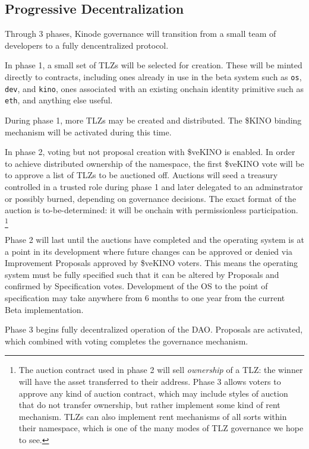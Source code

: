 \documentclass[runningheads]{llncs}
\begin{document}
\subsection{Progressive Decentralization}
\label{sec:daodecentralization}

Through 3 phases, Kinode governance will transition from a small team of developers to a fully dencentralized protocol.

In phase 1, a small set of TLZs will be selected for creation. These will be minted directly to contracts, including ones already in use in the beta system such as \verb|os|, \verb|dev|, and \verb|kino|, ones associated with an existing onchain identity primitive such as \verb|eth|, and anything else useful.

During phase 1, more TLZs may be created and distributed.
The \$KINO binding mechanism will be activated during this time.

In phase 2, voting but not proposal creation with \$veKINO is enabled.
In order to achieve distributed ownership of the namespace, the first \$veKINO vote will be to approve a list of TLZs to be auctioned off.
Auctions will seed a treasury controlled in a trusted role during phase 1 and later delegated to an adminstrator or possibly burned, depending on governance decisions.
The exact format of the auction is to-be-determined: it will be onchain with permissionless participation.
\footnote{The auction contract used in phase 2 will sell \textit{ownership} of a TLZ: the winner will have the asset transferred to their address.
Phase 3 allows voters to approve any kind of auction contract, which may include styles of auction that do not transfer ownership, but rather implement some kind of rent mechanism.
TLZs can also implement rent mechanisms of all sorts within their namespace, which is one of the many modes of TLZ governance we hope to see.}

Phase 2 will last until the auctions have completed and the operating system is at a point in its development where future changes can be approved or denied via Improvement Proposals approved by \$veKINO voters.
This means the operating system must be fully specified such that it can be altered by Proposals and confirmed by Specification votes.
Development of the OS to the point of specification may take anywhere from 6 months to one year from the current Beta implementation.

Phase 3 begins fully decentralized operation of the DAO.
Proposals are activated, which combined with voting completes the governance mechanism.
\end{document}
